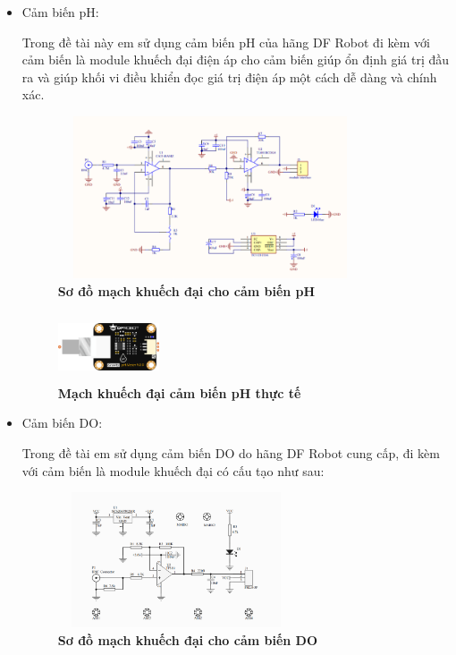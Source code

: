 \documentclass{article} %
\begin{document}
\begin{itemize}
\begin{itemize}[label=$\ast$]
			
			\item Cảm biến pH:
			
			Trong đề tài này em sử dụng cảm biến pH của hãng DF Robot đi kèm với cảm biến là module khuếch đại điện áp cho cảm biến giúp ổn định giá trị đầu ra và giúp khối vi điều khiển đọc giá trị điện áp một cách dễ dàng và chính xác.
			\begin{figure}[!ht]
				\centering
				\includegraphics[width=9cm,height=4.8cm]{Images/machPh.png}
				\caption[Sơ đồ mạch khuếch đại cho cảm biến pH\cite{pHDF}]{\bfseries \fontsize{12pt}{0pt}\selectfont Sơ đồ mạch khuếch đại cho cảm biến pH\cite{pHDF}}
				\label{machPh}
			\end{figure}
			
			\begin{figure}[!ht]
				\centering
				\includegraphics[width=3cm,height=2cm]{Images/pHthucte.png}
				\caption[Mạch khuếch đại cảm biến pH thực tế\cite{pHDF}]{\bfseries \fontsize{12pt}{0pt}\selectfont Mạch khuếch đại cảm biến pH thực tế\cite{pHDF}}
				\label{pHthucte}
			\end{figure}
			\item  Cảm biến DO:
			
			Trong đề tài em sử dụng cảm biến DO do hãng DF Robot cung cấp, đi kèm với cảm biến là module khuếch đại có cấu tạo như sau:
			
			\begin{figure}[!ht]
				\centering
				\includegraphics[width=7cm,height=4cm]{Images/Domachdo.png}
				\caption[Sơ đồ mạch khuếch đại cho cảm biến DO\cite{DODF}]{\bfseries \fontsize{12pt}{0pt}\selectfont Sơ đồ mạch khuếch đại cho cảm biến DO\cite{DODF}}
				\label{Domachdo}
			\end{figure}
			

\end{itemize}
\end{itemize}
\end{document}
